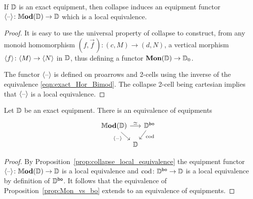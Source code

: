 \documentclass[11pt,oneside,article]{memoir}
\begin{document}
\begin{proposition}
      \label{prop:collapse_local_equivalence}
   If $\mathbb{D}$ is an exact equipment, then collapse induces an equipment functor $\langle\textrm{--}\rangle\colon\mathbb{M}\mathbf{od}(\mathbb{D})\to\mathbb{D}$ which is a local equivalence.
\end{proposition}
\begin{proof}
   It is easy to use the universal property of collapse to construct, from any monoid homomorphism
   $(f,\vec{f}\mspace{2mu})\colon(c,M)\to(d,N)$, a vertical morphism
   $\langle f\rangle\colon\langle M\rangle\to\langle N\rangle$ in $\mathbb{D}$, thus defining a functor
   $\mathbf{Mon}(\mathbb{D})\to\mathbb{D}_0$.

   The functor $\langle\textrm{--}\rangle$ is defined on proarrows and 2-cells using the inverse of the equivalence
   \eqref{eqn:exact_Hor_Bimod}. The collapse 2-cell being cartesian implies that $\langle\textrm{--}\rangle$ is a local equivalence.
\end{proof}

\begin{theorem}
      \label{thm:Mod_vs_bo}
   Let $\mathbb{D}$ be an exact equipment. There is an equivalence of equipments
   \[ \begin{tikzcd}[row sep=2.5ex, column sep=0em]
      \dMod(\dcat{D}) \ar[rr,"\equiv"]\ar[rd,"\Col{-}"' pos=.3] && \dcat{D}^{\bo}\ar[ld,"\cod" pos=.3]\\
      &\dcat{D}
   \end{tikzcd} \]
\end{theorem}
\begin{proof}
   By Proposition~\ref{prop:collapse_local_equivalence} the equipment functor $\langle\textrm{--}\rangle\colon\mathbb{M}\mathbf{od}(\mathbb{D})\to\mathbb{D}$ is a local equivalence and $\operatorname{cod}\colon\mathbb{D}^{\mathsf{bo}}\to\mathbb{D}$ is a local equivalence by definition of $\mathbb{D}^{\mathsf{bo}}$. It follows that the equivalence of Proposition~\ref{prop:Mon_vs_bo} extends to an equivalence of equipments.
\end{proof}
\end{document}
